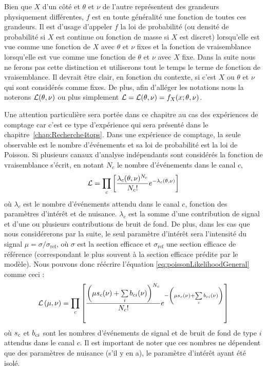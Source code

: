 Bien que $X$ d'un côté et $\theta$ et $\nu$ de l'autre représentent des grandeurs physiquement différentes, $f$ est en toute généralité une fonction de toutes ces grandeurs. Il est d'usage d'appeler $f$ la loi de probabilité (ou densit\'e de probabilit\'e si $X$ est continue ou fonction de masse si $X$ est discret) lorsqu'elle est vue comme une fonction de $X$ avec $\theta$ et $\nu$ fixes et la fonction de vraisemblance lorsqu'elle est vue comme une fonction de $\theta$ et $\nu$ avec $X$ fixe. Dans la suite nous ne ferons pas cette distinction et utiliserons tout le temps le terme de fonction de vraisemblance. Il devrait être clair, en fonction du contexte, si c'est $X$ ou $\theta$ et $\nu$ qui sont considérés comme fixes. De plus, afin d'alléger les notations nous la noterons ${\cal L}(\theta,\nu)$ ou plus simplement \mbox{${\cal L}={\cal L}(\theta,\nu)=f_X(x;\theta,\nu)$}.

Une attention particulière sera portée dans ce chapitre au cas des expériences de comptage car c'est ce type d'exp\'erience qui sera pr\'esent\'e dans le chapitre~\ref{chap:Recherche4tops}. 
Dans une expérience de comptage, la seule observable est le nombre d'événements et sa loi de probabilité est la loi de Poisson. Si plusieurs canaux d'analyse indépendants sont considérés la fonction de vraisemblance s'écrit, en notant $N_c$ le nombre d'événements dans le canal $c$,
\begin{equation}
\label{eq:poissonLikelihoodGeneral}
{\cal L}=\prod\limits_c\left[\frac{\lambda_c(\theta,\nu)^{N_{c}}}{N_{c}!}e^{-\lambda_c(\theta,\nu)}\right]
\end{equation} 
où $\lambda_c$ est le nombre d'événements attendu dans le canal $c$, fonction des paramètres d'intérêt et de nuisance. $\lambda_c$ est la somme d'une contribution de signal et d'une ou plusieurs contributions de bruit de fond. De plus, dans les cas que nous considérerons par la suite, le seul paramètre d'intérêt sera l'intensité du signal $\mu=\sigma/\sigma_\text{ref}$, o\`u $\sigma$ est la section efficace et $\sigma_\text{ref}$ une section efficace de r\'ef\'erence (correspondant le plus souvent \`a la section efficace pr\'edite par le mod\`ele). Nous pouvons donc r\'eécrire l'équation \ref{eq:poissonLikelihoodGeneral} comme ceci :
\begin{equation}
\label{eq:poissonLikelihoodExplicitSigBkg}                                                                                                        
{\cal L}\left(\mu,\nu\right)=\prod\limits_c\left[\frac{\left(\mu s_c(\nu)+\sum\limits_i b_{ci}(\nu)\right)^{N_{c}}}{N_{c}!}e^{-\left(\mu s_c(\nu)+\sum\limits_i b_{ci}(\nu)\right)}\right]
\end{equation}
où $s_c$ et $b_{ci}$ sont les nombres d'événements de signal et de bruit de fond de type $i$ attendus dans le canal $c$. Il est important de noter que ces nombres ne dépendent que des paramètres de nuisance (s'il y en a), le param\`etre d'int\'er\^et ayant \'et\'e isol\'e. 

